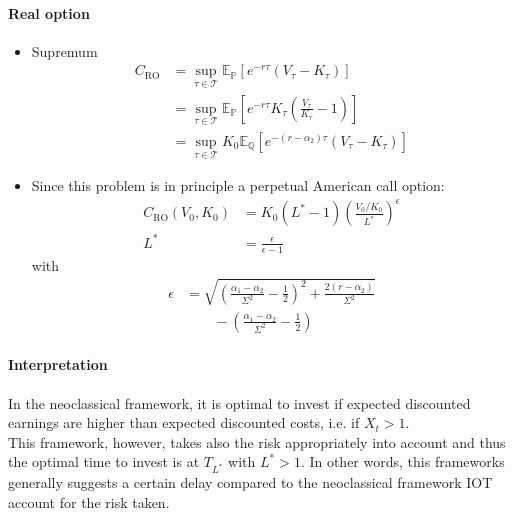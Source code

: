 \documentclass[a4paper,landscape,8pt,fleqn]{scrartcl}
\makeatletter
\renewcommand{\subsection}{\@startsection{subsection}{1}{0mm}%
{-2\baselineskip}{0.8\baselineskip}%
{\hrule depth 0.2pt width\columnwidth\hrule depth0.75pt
width0.25\columnwidth\vspace*{1.2em}\large\bfseries}}
\makeatother
\begin{document}
\begin{multicols*}{4}
\paragraph{Real option}
\begin{itemize}
\item Supremum
\begin{align*}
C_\text{RO} &= \sup_{\tau \in \mathcal{T}} \mathbb{E}_\mathbb{P} \left[ e^{-r \tau} (V_\tau - K_\tau) \right] \\
&= \sup_{\tau \in \mathcal{T}} \mathbb{E}_\mathbb{P} \left[ e^{-r \tau} K_\tau \left( \frac{V_\tau}{K_\tau} - 1 \right) \right] \\
&= \sup_{\tau \in \mathcal{T}} K_0 \mathbb{E}_\mathbb{Q} \left[ e^{-(r - \alpha_2) \tau} (V_\tau - K_\tau) \right]
\end{align*}
\item Since this problem is in principle a perpetual American call option:
\begin{align*}
C_\text{RO}(V_0,K_0) &= K_0 (L^\ast - 1) \left( \frac{V_0/K_0}{L^\ast} \right)^\epsilon \\
L^\ast &= \frac{\epsilon}{\epsilon - 1}
\end{align*}
with
\begin{align*}
\epsilon &= \sqrt{\left( \frac{\alpha_1 - \alpha_2}{\Sigma^2} - \frac{1}{2} \right)^2 + \frac{2(r-\alpha_2)}{\Sigma^2}} \\
& \qquad - \left( \frac{\alpha_1 - \alpha_2}{\Sigma^2} - \frac{1}{2} \right)
\end{align*}
\end{itemize}

\paragraph{Interpretation}
In the neoclassical framework, it is optimal to invest if expected discounted earnings are higher than expected discounted costs, i.e. if $X_t > 1$. \\
This framework, however, takes also the risk appropriately into account and thus the optimal time to invest is at $T_{L^\ast}$ with $L^\ast > 1$. In other words, this frameworks generally suggests a certain delay compared to the neoclassical framework IOT account for the risk taken.



\end{multicols*}
\end{document}
